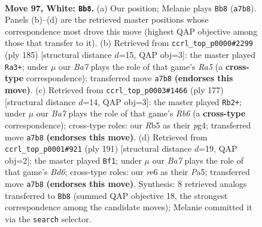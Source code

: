 \documentclass[11pt]{article}
\begin{document}
\clearpage

\begin{figure}[p]\centering
\begin{subfigure}{0.46\textwidth}\centering
\resizebox{\linewidth}{!}{%
\newchessgame
\chessboard[
  setfen={6k1/B7/4r3/1R5P/4p3/5p2/3K1P2/8 w - - 1 97},
  showmover=false,
  pgfstyle=straightmove, color=movearrow, markmove={a7-b8}
]}
\caption{}
\end{subfigure}\hfill
\begin{subfigure}{0.46\textwidth}\centering
\resizebox{\linewidth}{!}{%
\newchessgame
\chessboard[
  setfen={8/8/7k/5R2/r5p1/3K2P1/5P2/8 b - - 91 93},
  showmover=false,
  pgfstyle=straightmove, color=movearrow, markmove={a4-a3}
]}
\caption{}
\end{subfigure}
\\[4pt]
\begin{subfigure}{0.46\textwidth}\centering
\resizebox{\linewidth}{!}{%
\newchessgame
\chessboard[
  setfen={8/5pk1/4p3/4P3/3R1PP1/1r6/5K2/8 b - - 94 89},
  showmover=false,
  pgfstyle=straightmove, color=movearrow, markmove={b3-b2}
]}
\caption{}
\end{subfigure}\hfill
\begin{subfigure}{0.46\textwidth}\centering
\resizebox{\linewidth}{!}{%
\newchessgame
\chessboard[
  setfen={8/5k2/7P/pp4P1/3K4/P2b4/8/8 b - - 58 96},
  showmover=false,
  pgfstyle=straightmove, color=movearrow, markmove={d3-f1}
]}
\caption{}
\end{subfigure}
\caption{\textbf{Move 97, White: \texttt{Bb8}.} (a) Our position; Melanie plays \texttt{Bb8} (\texttt{a7b8}). Panels (b)--(d) are the retrieved master positions whose correspondence most drove this move (highest QAP objective among those that transfer to it). (b) Retrieved from \texttt{ccrl\_top\_p0000\#2299} (ply 185) [structural distance $d$=15, QAP obj=3]: the master played \texttt{Ra3+}; under $\mu$ our \emph{Ba7} plays the role of that game's \emph{Ra5} (a \textbf{cross-type} correspondence); transferred move \texttt{a7b8} \textbf{(endorses this move)}. (c) Retrieved from \texttt{ccrl\_top\_p0003\#1466} (ply 177) [structural distance $d$=14, QAP obj=3]: the master played \texttt{Rb2+}; under $\mu$ our \emph{Ba7} plays the role of that game's \emph{Rb6} (a \textbf{cross-type} correspondence); cross-type roles: our \emph{R}b5 as their \emph{p}g4; transferred move \texttt{a7b8} \textbf{(endorses this move)}. (d) Retrieved from \texttt{ccrl\_top\_p0001\#921} (ply 191) [structural distance $d$=19, QAP obj=2]: the master played \texttt{Bf1}; under $\mu$ our \emph{Ba7} plays the role of that game's \emph{Bd6}; cross-type roles: our \emph{r}e6 as their \emph{P}a5; transferred move \texttt{a7b8} \textbf{(endorses this move)}. Synthesis: 8 retrieved analogs transferred to \texttt{Bb8} (summed QAP objective 18, the strongest correspondence among the candidate moves); Melanie committed it via the \texttt{search} selector.}
\label{fig:thought-m192}
\end{figure}
\end{document}
